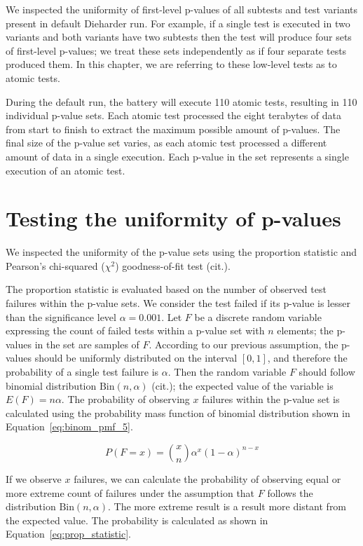\documentclass[
  digital,  	%
  color,		%
  oneside,   	%
  12pt,
  nocover,
  notable,
  nolof,
  nolot,
]{fithesis3}
\theoremstyle{definition}
\theoremstyle{remark}
\begin{document}
We inspected the uniformity of first-level p-values of all subtests and test variants present in default Dieharder run. For example, if a single test is executed in two variants and both variants have two subtests then the test will produce four sets of first-level p-values; we treat these sets independently as if four separate tests produced them. In this chapter, we are referring to these low-level tests as to atomic tests.

During the default run, the battery will execute 110 atomic tests, resulting in 110 individual p-value sets. Each atomic test processed the eight terabytes of data from start to finish to extract the maximum possible amount of p-values. The final size of the p-value set varies, as each atomic test processed a different amount of data in a single execution. Each p-value in the set represents a single execution of an atomic test.

\section{Testing the uniformity of p-values}
We inspected the uniformity of the p-value sets using the proportion statistic and Pearson's chi-squared ($\chi^2$) goodness-of-fit test (cit.).

The proportion statistic is evaluated based on the number of observed test failures within the p-value sets. We consider the test failed if its p-value is lesser than the significance level $\alpha=0.001$. Let $F$ be a discrete random variable expressing the count of failed tests within a p-value set with $n$ elements; the p-values in the set are samples of $F$. According to our previous assumption, the p-values should be uniformly distributed on the interval $[0,1]$, and therefore the probability of a single test failure is $\alpha$. Then the random variable $F$ should follow binomial distribution $\text{Bin}(n,\alpha)$ (cit.); the expected value of the variable is $E(F) = n\alpha$. The probability of observing $x$ failures within the p-value set is calculated using the probability mass function of binomial distribution shown in Equation~\ref{eq:binom_pmf_5}.

\begin{equation}
\label{eq:binom_pmf_5}
P(F = x) = \binom xn \alpha^x(1-\alpha)^{n-x}
\end{equation}

If we observe $x$ failures, we can calculate the probability of observing equal or more extreme count of failures under the assumption that $F$ follows the distribution $\text{Bin}(n,\alpha)$. The more extreme result is a result more distant from the expected value. The probability is calculated as shown in Equation~\ref{eq:prop_statistic}.
\end{document}
